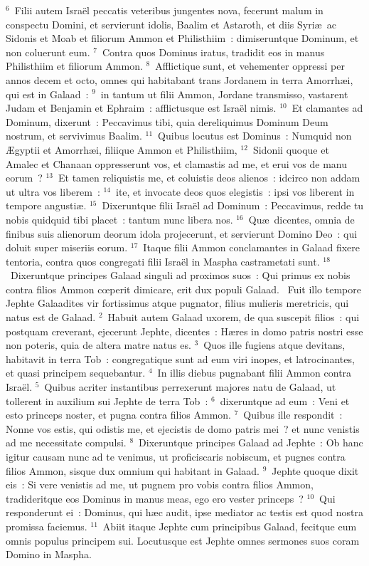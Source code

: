 ${}^{6}$~Filii autem Isra\"el peccatis veteribus jungentes nova, fecerunt malum in conspectu Domini, et servierunt idolis, Baalim et Astaroth, et diis Syri\ae\ ac Sidonis et Moab et filiorum Ammon et Philisthiim~: dimiseruntque Dominum, et non coluerunt eum.
${}^{7}$~Contra quos Dominus iratus, tradidit eos in manus Philisthiim et filiorum Ammon.
${}^{8}$~Afflictique sunt, et vehementer oppressi per annos decem et octo, omnes qui habitabant trans Jordanem in terra Amorrh\ae i, qui est in Galaad~:
${}^{9}$~in tantum ut filii Ammon, Jordane transmisso, vastarent Judam et Benjamin et Ephraim~: afflictusque est Isra\"el nimis.
${}^{10}$~Et clamantes ad Dominum, dixerunt~: Peccavimus tibi, quia dereliquimus Dominum Deum nostrum, et servivimus Baalim.
${}^{11}$~Quibus locutus est Dominus~: Numquid non \AE gyptii et Amorrh\ae i, filiique Ammon et Philisthiim,
${}^{12}$~Sidonii quoque et Amalec et Chanaan oppresserunt vos, et clamastis ad me, et erui vos de manu eorum~?
${}^{13}$~Et tamen reliquistis me, et coluistis deos alienos~: idcirco non addam ut ultra vos liberem~:
${}^{14}$~ite, et invocate deos quos elegistis~: ipsi vos liberent in tempore angusti\ae .
${}^{15}$~Dixeruntque filii Isra\"el ad Dominum~: Peccavimus, redde tu nobis quidquid tibi placet~: tantum nunc libera nos.
${}^{16}$~Qu\ae\ dicentes, omnia de finibus suis alienorum deorum idola projecerunt, et servierunt Domino Deo~: qui doluit super miseriis eorum.
${}^{17}$~Itaque filii Ammon conclamantes in Galaad fixere tentoria, contra quos congregati filii Isra\"el in Maspha castrametati sunt.
${}^{18}$~Dixeruntque principes Galaad singuli ad proximos suos~: Qui primus ex nobis contra filios Ammon cœperit dimicare, erit dux populi Galaad.
~Fuit illo tempore Jephte Galaadites vir fortissimus atque pugnator, filius mulieris meretricis, qui natus est de Galaad.
${}^{2}$~Habuit autem Galaad uxorem, de qua suscepit filios~: qui postquam creverant, ejecerunt Jephte, dicentes~: H\ae res in domo patris nostri esse non poteris, quia de altera matre natus es.
${}^{3}$~Quos ille fugiens atque devitans, habitavit in terra Tob~: congregatique sunt ad eum viri inopes, et latrocinantes, et quasi principem sequebantur.
${}^{4}$~In illis diebus pugnabant filii Ammon contra Isra\"el.
${}^{5}$~Quibus acriter instantibus perrexerunt majores natu de Galaad, ut tollerent in auxilium sui Jephte de terra Tob~:
${}^{6}$~dixeruntque ad eum~: Veni et esto princeps noster, et pugna contra filios Ammon.
${}^{7}$~Quibus ille respondit~: Nonne vos estis, qui odistis me, et ejecistis de domo patris mei~? et nunc venistis ad me necessitate compulsi.
${}^{8}$~Dixeruntque principes Galaad ad Jephte~: Ob hanc igitur causam nunc ad te venimus, ut proficiscaris nobiscum, et pugnes contra filios Ammon, sisque dux omnium qui habitant in Galaad.
${}^{9}$~Jephte quoque dixit eis~: Si vere venistis ad me, ut pugnem pro vobis contra filios Ammon, tradideritque eos Dominus in manus meas, ego ero vester princeps~?
${}^{10}$~Qui responderunt ei~: Dominus, qui h\ae c audit, ipse mediator ac testis est quod nostra promissa faciemus.
${}^{11}$~Abiit itaque Jephte cum principibus Galaad, fecitque eum omnis populus principem sui. Locutusque est Jephte omnes sermones suos coram Domino in Maspha.



